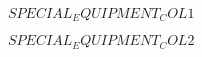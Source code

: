 \raggedcolumns
\begin{multicols}{2}


	\kindredsintro{}
	
	$SPECIAL_EQUIPMENT_COL1$


	\columnbreak


	\aspectsofnatureintro{}
	$SPECIAL_EQUIPMENT_COL2$

\end{multicols}

